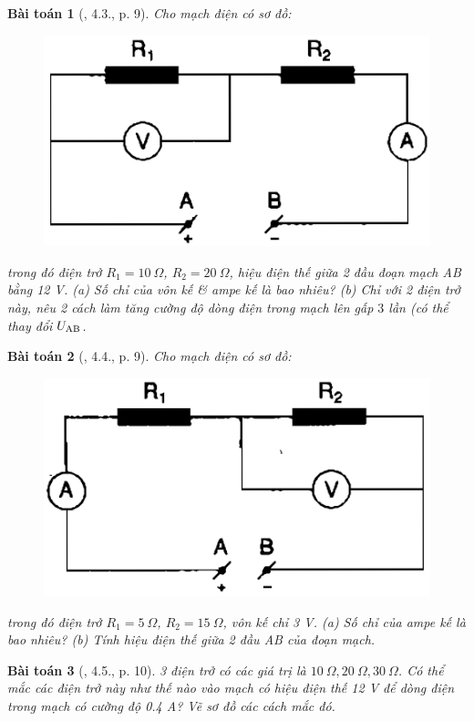 \documentclass{article}
\newtheorem{baitoan}{Bài toán}
\begin{document}
\begin{baitoan}[\cite{SBT_Vat_Ly_9}, 4.3., p. 9]
	Cho mạch điện có sơ đồ:
	\begin{figure}[H]
		\centering
		\includegraphics[scale=0.25]{SBT_4.1}
	\end{figure}
	\noindent trong đó điện trở $R_1 = 10\ \Omega$, $R_2 = 20\ \Omega$, hiệu điện thế giữa 2 đầu đoạn mạch \emph{AB} bằng \emph{12 V}. (a) Số chỉ của vôn kế \& ampe kế là bao nhiêu? (b) Chỉ với 2 điện trở này, nêu 2 cách làm tăng cường độ dòng điện trong mạch lên gấp $3$ lần (có thể thay đổi $U_{\rm AB}$.
\end{baitoan}

\begin{baitoan}[\cite{SBT_Vat_Ly_9}, 4.4., p. 9]
	Cho mạch điện có sơ đồ:
	\begin{figure}[H]
		\centering
		\includegraphics[scale=0.25]{SBT_4.2}
	\end{figure}
	\noindent trong đó điện trở $R_1 = 5\ \Omega$, $R_2 = 15\ \Omega$, vôn kế chỉ \emph{3 V}. (a) Số chỉ của ampe kế là bao nhiêu? (b) Tính hiệu điện thế giữa 2 đầu \emph{AB} của đoạn mạch.
\end{baitoan}

\begin{baitoan}[\cite{SBT_Vat_Ly_9}, 4.5., p. 10]
	3 điện trở có các giá trị là $10\ \Omega,20\ \Omega, 30 \ \Omega$. Có thể mắc các điện trở này như thế nào vào mạch có hiệu điện thế \emph{12 V} để dòng điện trong mạch có cường độ \emph{0.4 A}? Vẽ sơ đồ các cách mắc đó.
\end{baitoan}
\end{document}
